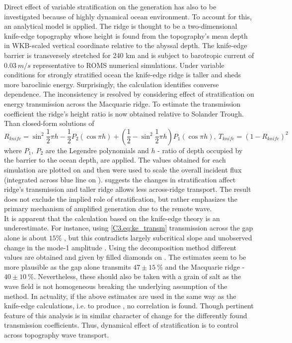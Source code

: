 \documentclass[12pt]{article}
\begin{document}
Direct effect of variable stratification on the generation has also to be investigated because of 
highly dynamical ocean environment. To account for this, an analytical model 
\citep{st2003generation} is 
applied. The 
ridge is thought to be a two-dimensional knife-edge 
topography whose height is found from the topography's mean depth in WKB-scaled vertical coordinate 
\citep{althaus2003internal} relative to the abyssal depth. The knife-edge barrier is transversely 
stretched for 240 km and is subject to barotropic current of $0.03~m/s$ representative to ROMS 
numerical simulations. Under variable conditions for strongly stratified ocean the knife-edge ridge 
is taller and sheds more baroclinic energy. Surprisingly, the calculation 
 identifies converse dependence. The inconsistency is 
resolved by considering effect of stratification on energy transmission across the Macquarie ridge. 
To estimate the transmission coefficient the ridge's height ratio is now obtained relative to 
Solander Trough. Than closed-form solutions of \citep{larsen1969internal} 
\begin{equation}
\label{C3.eq:ke_transm}
R_{knife} = \sin^2 \frac{1}{2} \pi h - \frac{1}{2} P_2( \cos \pi h ) + (\frac{1}{2} - \sin^2 
\frac{1}{2} \pi h) P_1( \cos \pi h ),~
T_{knife} = (1 - R_{knife})^2
\end{equation}
where $P_1,~P_2$ are the Legendre polynomials and $h$ - ratio of depth occupied by the barrier to 
the ocean depth, are applied. The values obtained for each simulation are plotted on 
 and then were used to scale the overall 
incident flux 
(integrated across blue line on ).  
suggests the changes in stratification affect ridge's transmission and taller ridge allows less 
across-ridge transport. The result does not exclude the implied role of stratification, but rather 
emphasizes the primary mechanism of amplified generation due to the remote wave.\\

It is apparent that the calculation based on the knife-edge theory is an underestimate. For 
instance, using \eqref{C3.eq:ke_transm} transmission across the gap alone is 
about $15\%$ , but this contradicts largely subcritical 
slope and unobserved change in the mode-1 amplitude . Using the 
decomposition method different values are obtained and given by filled diamonds on 
. The estimates seem to be more plausible as the gap alone 
transmits $47 \pm 15~\%$ and the Macquarie ridge - $40 \pm 10~\%$. Nevertheless, these should also 
be taken with a grain of salt as the wave field is not homogeneous breaking the 
underlying assumption of the method. In actuality, if the above estimates are used in the same way 
as the knife-edge calculations, i.e. to produce , no correlation is 
found. Though pertinent feature of this analysis is in similar character of change for the 
differently found transmission coefficients. Thus, dynamical effect of stratification is to control 
across topography wave transport.\\
\end{document}
